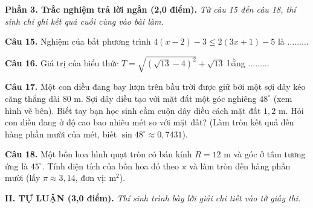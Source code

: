 \documentclass[11pt,a4paper]{article}
\begin{document}
\vspace{3mm}
\noindent
\textbf{Phần 3. Trắc nghiệm trả lời ngắn (2,0 điểm).} \textit{Từ câu 15 đến câu 18, thí sinh chỉ ghi kết quả cuối cùng vào bài làm.}

\vspace{1.5mm}
\textbf{Câu 15.} Nghiệm của bất phương trình $4(x - 2) - 3 \le 2(3x + 1) - 5$ là $\dots\dots\dots$

\vspace{1.5mm}
\textbf{Câu 16.} Giá trị của biểu thức $T = \sqrt{(\sqrt{13} - 4)^2} + \sqrt{13}$ bằng $\dots\dots\dots$

\vspace{1.5mm}
\noindent
\begin{minipage}[c]{0.65\linewidth}
\textbf{Câu 17.} Một con diều đang bay lượn trên bầu trời được giữ bởi một sợi dây kéo căng thẳng dài $80\text{ m}$. Sợi dây diều tạo với mặt đất một góc nghiêng $48^\circ$ (xem hình vẽ bên). Biết tay bạn học sinh cầm cuộn dây diều cách mặt đất $1{,}2\text{ m}$. Hỏi con diều đang ở độ cao bao nhiêu mét so với mặt đất? (Làm tròn kết quả đến hàng phần mười của mét, biết $\sin 48^\circ \approx 0{,}7431$).
\end{minipage}\hfill
\begin{minipage}[c]{0.32\linewidth}
\centering
{}
\end{minipage}

\vspace{1.5mm}
\textbf{Câu 18.} Một bồn hoa hình quạt tròn có bán kính $R = 12\text{ m}$ và góc ở tâm tương ứng là $45^\circ$. Tính diện tích của bồn hoa đó theo $\pi$ và làm tròn đến hàng phần mười (lấy $\pi \approx 3{,}14$, đơn vị: $\text{m}^2$).

\vspace{4mm}
\noindent
\textbf{\large II. TỰ LUẬN (3,0 điểm).} \textit{Thí sinh trình bày lời giải chi tiết vào tờ giấy thi.}
\end{document}
